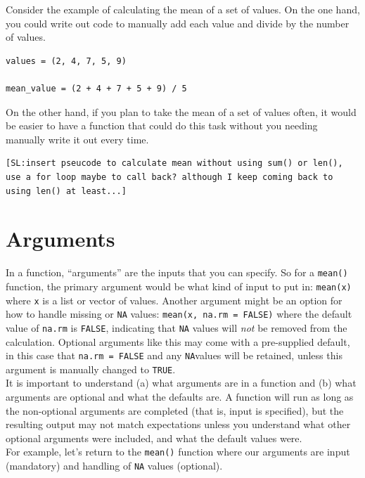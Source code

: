 \documentclass[
]{book}
\begin{document}
Consider the example of calculating the mean of a set of values. On the one hand, you could write out code to manually add each value and divide by the number of values.\\

\begin{verbatim}
values = (2, 4, 7, 5, 9)

mean_value = (2 + 4 + 7 + 5 + 9) / 5
\end{verbatim}

\hfill\break
On the other hand, if you plan to take the mean of a set of values often, it would be easier to have a function that could do this task without you needing manually write it out every time.

\begin{verbatim}
[SL:insert pseucode to calculate mean without using sum() or len(), use a for loop maybe to call back? although I keep coming back to using len() at least...]
\end{verbatim}

\section{Arguments}\label{arguments}

In a function, ``arguments'' are the inputs that you can specify. So for a \texttt{mean()} function, the primary argument would be what kind of input to put in: \texttt{mean(x)} where \texttt{x} is a list or vector of values. Another argument might be an option for how to handle missing or \texttt{NA} values: \texttt{mean(x,\ na.rm\ =\ FALSE)} where the default value of \texttt{na.rm} is \texttt{FALSE}, indicating that \texttt{NA} values will \emph{not} be removed from the calculation. Optional arguments like this may come with a pre-supplied default, in this case that \texttt{na.rm\ =\ FALSE} and any \texttt{NA}values will be retained, unless this argument is manually changed to \texttt{TRUE}.\\

It is important to understand (a) what arguments are in a function and (b) what arguments are optional and what the defaults are. A function will run as long as the non-optional arguments are completed (that is, input is specified), but the resulting output may not match expectations unless you understand what other optional arguments were included, and what the default values were.\\

For example, let's return to the \texttt{mean()} function where our arguments are input (mandatory) and handling of \texttt{NA} values (optional).
\end{document}

